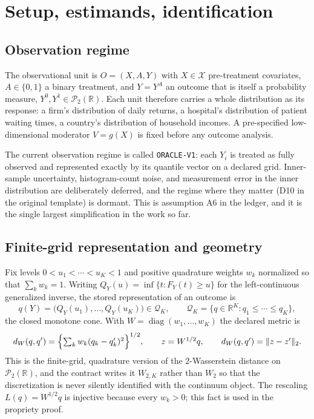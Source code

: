 \documentclass[11pt,a4paper]{article}
\theoremstyle{definition}
\theoremstyle{remark}
\newcommand{\Pcal}{\mathcal{P}}
\newcommand{\Qcal}{\mathcal{Q}}
\newcommand{\Xcal}{\mathcal{X}}
\newcommand{\Real}{\mathbb{R}}
\newcommand{\dW}{d_W}
\begin{document}
\section{Setup, estimands, identification}

\subsection{Observation regime}

The observational unit is $O = (X, A, Y)$ with $X \in \Xcal$ pre-treatment
covariates, $A \in \{0,1\}$ a binary treatment, and $Y = Y^A$ an
outcome that is itself a probability measure, $Y^0, Y^1 \in \Pcal_2(\Real)$.
Each unit therefore carries a whole distribution as its response: a firm's
distribution of daily returns, a hospital's distribution of patient waiting
times, a country's distribution of household incomes. A pre-specified
low-dimensional moderator $V = g(X)$ is fixed before any outcome analysis.

The current observation regime is called \texttt{ORACLE-V1}: each $Y_i$ is
treated as fully observed and represented exactly by its quantile vector on a
declared grid. Inner-sample uncertainty, histogram-count noise, and measurement
error in the inner distribution are deliberately deferred, and the regime
where they matter (D10 in the original template) is dormant. This is assumption
A6 in the ledger, and it is the single largest simplification in the work so
far.

\subsection{Finite-grid representation and geometry}

Fix levels $0 < u_1 < \cdots < u_K < 1$ and positive quadrature weights $w_k$
normalized so that $\sum_k w_k = 1$. Writing $Q_Y(u) = \inf\{t : F_Y(t) \geq u\}$
for the left-continuous generalized inverse, the stored representation of an
outcome is
\[
q(Y) = \bigl(Q_Y(u_1), \ldots, Q_Y(u_K)\bigr) \in \Qcal_K,
\qquad
\Qcal_K = \{q \in \Real^K : q_1 \leq \cdots \leq q_K\},
\]
the closed monotone cone. With $W = \operatorname{diag}(w_1,\ldots,w_K)$ the
declared metric is
\[
\dW(q, q') = \Bigl\{\textstyle\sum_{k} w_k (q_k - q'_k)^2\Bigr\}^{1/2},
\qquad
z = W^{1/2} q,
\qquad
\dW(q,q') = \|z - z'\|_2 .
\]
This is the finite-grid, quadrature version of the $2$-Wasserstein distance on
$\Pcal_2(\Real)$, and the contract writes it $W_{2,K}$ rather than $W_2$ so that
the discretization is never silently identified with the continuum object. The
rescaling $L(q) = W^{1/2} q$ is injective because every $w_k > 0$; this fact is
used in the propriety proof.
\end{document}

